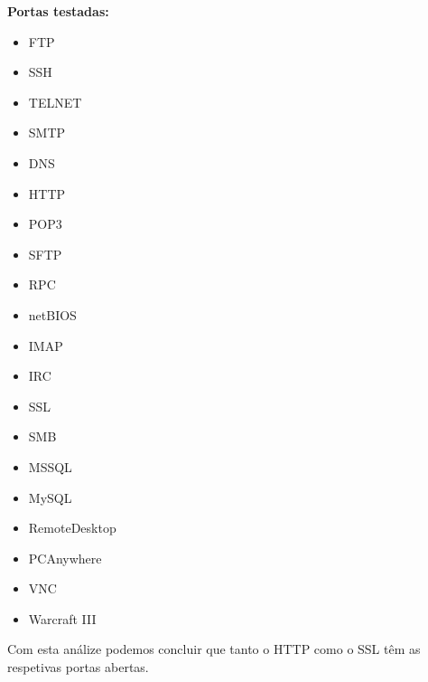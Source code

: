 \par \textbf{Portas testadas:} 
\begin{itemize}
\item FTP
\item SSH
\item TELNET
\item SMTP
\item DNS
\item HTTP
\item POP3
\item SFTP
\item RPC
\item netBIOS
\item IMAP
\item IRC
\item SSL
\item SMB
\item MSSQL
\item MySQL
\item RemoteDesktop
\item PCAnywhere
\item VNC
\item Warcraft III
\end{itemize}

\par Com esta análize podemos concluir que tanto o HTTP como o SSL têm as respetivas portas abertas.